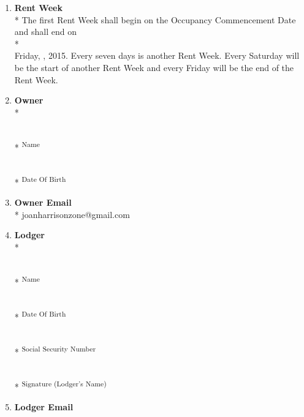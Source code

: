 \documentclass[12pt,letterpaper]{article}
\newcommand{\datefillin}{\hspace{0.2cm}\makebox[3cm]{\hrulefill}}
\newcommand{\lname}{Lodger's Name}
\newcommand{\ownermail}{Owner Email}
\newcommand{\firstday}{Occupancy Commencement Date}
\newcommand{\rentweek}{Rent Week}
\newcommand{\lemail}{Lodger Email}
\begin{document}
\begin{multicols}{2}
\begin{enumerate}
		\item \textbf{\rentweek{}}\\* \label{rentweek}
			The first \rentweek{} shall begin on the \firstday{} and shall end on \\* \\
			Friday, \datefillin, 2015. Every seven days is another \rentweek{}. Every Saturday will be the start of another \rentweek{} and every Friday will be the end of the \rentweek{}.
			
		\item \textbf{Owner}\\* \label{owner}
			\begin{minipage}[t]{2in}

				\vspace{0.5cm}\makebox[2in]{\hrulefill} \\*
				\textsuperscript{Name}
				
				\vspace{0.5cm}\makebox[2in]{\hrulefill} \\*
				\textsuperscript{Date Of Birth}
			\end{minipage}%

		\item \textbf{\ownermail{}}\\* \label{ownermail}
			joanharrisonzone@gmail.com

		\item \textbf{Lodger}\\* \label{lodger}
			\begin{minipage}[t]{2in}

				\vspace{0.5cm}\makebox[2in]{\hrulefill} \\*
				\textsuperscript{Name}
				
				\vspace{0.5cm}\makebox[2in]{\hrulefill} \\*
				\textsuperscript{Date Of Birth}
				
				\vspace{0.5cm}\makebox[2in]{\hrulefill} \\*
				\textsuperscript{Social Security Number}
				
				\vspace{0.5cm}\makebox[2in]{\hrulefill} \\*
				\textsuperscript{Signature (\lname{})}
			\end{minipage}%

		\item \textbf{\lemail{}} \label{lemail}

			\vspace{0.5cm}\makebox[2in]{\hrulefill}

			\vspace{0.5cm}\makebox[2in]{\hrulefill}
	\end{enumerate}
\end{multicols}
\end{document}
